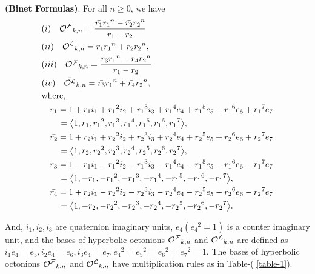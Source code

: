 \begin{theorem}\textbf{(Binet Formulas)}. For all $n\geq{0}$, we have\label{2.3}
\begin{align*}
&(i)\quad {{\mathcal{O^F}}}_{k,n}= \dfrac{\bar{r_1}{{r_1}}^n-\bar
{r_2}{r_{2}}^n}{r_1-r_2}\\
&(ii)\quad {{\mathcal{O^L}}}_{k,n}= \bar{r_1}{r_{1}}^n +\bar{r_2}{r_{2}}^n,\\
&(iii)\quad \bar{{{\mathcal{O^F}}}}_{k,n}= \dfrac{\bar{r_3}{{r_1}}^n-\bar
{r_4}{r_{2}}^n}{r_1-r_2}\\
&(iv)\quad \bar{{{\mathcal{O^L}}}}_{k,n}= \bar{r_3}{r_{1}}^n +\bar{r_4}{r_{2}}^n,\\
& \text{where,}\\
 & \quad \bar{r_1}=1+r_1i_1+{r_1}^2i_2+{r_1}^3i_3+{r_1}^4e_4+{r_1}^5e_5+{r_1}^6e_6+{r_1}^7e_7\\
 &\qquad =\big\langle 1, r_1, {r_1}^2, {r_1}^3, {r_1}^4, {r_1}^5, {r_1}^6, {r_1}^7\big\rangle,\\
 &\quad \bar{r_2}=1+r_2i_1+{r_2}^2i_2+{r_2}^3i_3+{r_2}^4e_4+{r_2}^5e_5+{r_2}^6e_6+{r_2}^7e_7\\
 &\qquad =\big\langle 1, r_2, {r_2}^2, {r_2}^3, {r_2}^4, {r_2}^5, {r_2}^6, {r_2}^7\big\rangle,\\
 &\quad \bar{r_3}=1-r_1i_1-{r_1}^2i_2-{r_1}^3i_3-{r_1}^4e_4-{r_1}^5e_5-{r_1}^6e_6-{r_1}^7e_7\\
 &\qquad =\big\langle 1,- r_1, -{r_1}^2, -{r_1}^3, -{r_1}^4, -{r_1}^5, -{r_1}^6, -{r_1}^7\big\rangle,\\
 &\quad \bar{r_4}=1+r_2i_1-{r_2}^2i_2-{r_2}^3i_3-{r_2}^4e_4-{r_2}^5e_5-{r_2}^6e_6-{r_2}^7e_7\\
 &\qquad =\big\langle 1, -r_2, -{r_2}^2, -{r_2}^3, -{r_2}^4, -{r_2}^5, -{r_2}^6, -{r_2}^7\big\rangle.
 \end{align*}
 \end{theorem}
And, $i_1, i_2, i_3$ are quaternion imaginary units, $e_4 ({e_4}^2=1)$ is a counter imaginary unit, and the bases of hyperbolic octonions ${{\mathcal{O^F}}}_{k,n}$ and ${{\mathcal{O^L}}}_{k,n}$ are defined as $i_1e_4=e_5, i_2e_4=e_6,i_3e_4=e_7, {e_4}^2={e_5}^2={e_6}^2={e_7}^2=1$.
The bases of hyperbolic octonions ${{\mathcal{O^F}}}_{k,n}$ and ${{\mathcal{O^L}}}_{k,n}$ have multiplication rules as in Table-( \ref{table-1}).
